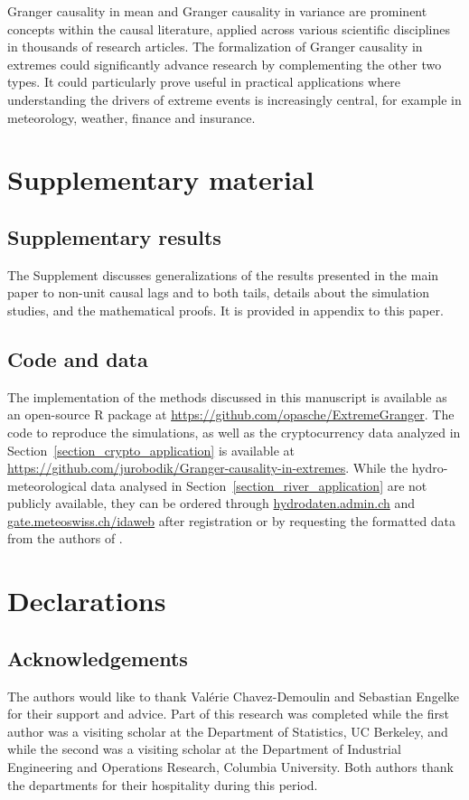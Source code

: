 \documentclass[a4paper,11pt]{article}
\begin{document}
Granger causality in mean and Granger causality in variance are prominent concepts within the causal literature, applied across various scientific disciplines in thousands of research articles. The formalization of Granger causality in extremes could significantly advance research by complementing the other two types. It could particularly prove useful in practical applications where understanding the drivers of extreme events is increasingly central, for example in meteorology, weather, finance and insurance.












\section*{Supplementary material}
\subsection*{Supplementary results}
The Supplement discusses generalizations of the results presented in the main paper to non-unit causal lags and to both tails, details about the simulation studies, and the mathematical proofs.
It is provided in appendix to this paper. 


\subsection*{Code and data}
The implementation of the methods discussed in this manuscript is available as an open-source R package at \url{https://github.com/opasche/ExtremeGranger}. 
The code to reproduce the simulations, as well as the cryptocurrency data analyzed in Section~\ref{section_crypto_application} is available at \url{https://github.com/jurobodik/Granger-causality-in-extremes}. 
While the hydro-meteorological data analysed in Section~\ref{section_river_application} are not publicly available, they can be ordered through \url{hydrodaten.admin.ch} and \url{gate.meteoswiss.ch/idaweb} after registration or by requesting the formatted data from the authors of \cite{Pasche}.



\section*{Declarations}

\subsection*{Acknowledgements}
The authors would like to thank Val\'erie Chavez-Demoulin and Sebastian Engelke for their support and advice. 
Part of this research was completed while the first author was a visiting scholar at the Department of Statistics, UC Berkeley, and while the second was a visiting scholar at the Department of Industrial Engineering and Operations Research, Columbia University. Both authors thank the departments for their hospitality during this period. 
\end{document}
